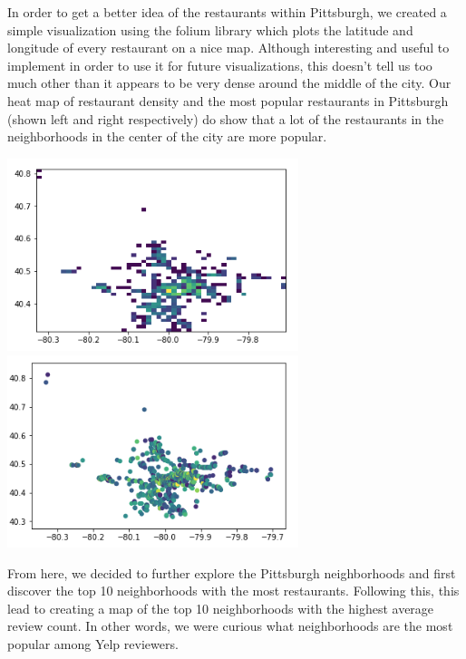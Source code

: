 \documentclass{neu_handout}
\begin{document}
In order to get a better idea of the restaurants within Pittsburgh, we created a simple visualization using the folium library which plots the latitude and longitude of every restaurant on a nice map. Although interesting and useful to implement in order to use it for future visualizations, this doesn't tell us too much other than it appears to be very dense around the middle of the city. Our heat map of restaurant density and the most popular restaurants in Pittsburgh (shown left and right respectively) do show that a lot of the restaurants in the neighborhoods in the center of the city are more popular.

\begin{center}
\includegraphics[width=85mm,scale=0.5]{pa_rest_density}
\includegraphics[width=85mm,scale=0.5]{pa_popular_restaurants}
\end{center}

From here, we decided to further explore the Pittsburgh neighborhoods and first discover the top 10 neighborhoods with the most restaurants. Following this, this lead to creating a map of the top 10 neighborhoods with the highest average review count. In other words, we were curious what neighborhoods are the most popular among Yelp reviewers.
\end{document}
